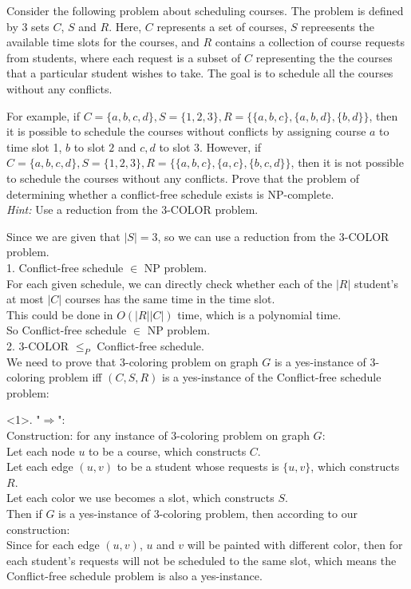 \problem{}
Consider the following problem about scheduling courses.  The problem is defined by 3 sets $C$, $S$ and $R$.  Here, $C$ represents a set of  courses, $S$ repreesents the available time slots for the courses, and $R$ contains a collection of course requests from students, where each request is a subset of $C$ representing the the courses that a particular student wishes to take.  The goal is to schedule all the courses without any conflicts.  

For example, if $C = \{a, b, c, d\}, S = \{1, 2, 3\}, R = \{\{a, b, c\}, \{a, b, d\}, \{b, d\}\}$, then it is possible to schedule the courses without conflicts by assigning course $a$ to time slot 1, $b$ to slot $2$ and $c, d$ to slot 3.  However, if $C = \{a, b, c, d\}, S = \{1, 2, 3\}, R = \{\{a, b, c\}, \{a, c\}, \{b, c, d\}\}$, then it is not possible to schedule the courses without any conflicts.  Prove that the problem of determining whether a conflict-free schedule exists is NP-complete. \\

\noindent  \emph{Hint:}  Use a reduction from the 3-COLOR problem.

\solution{}
Since we are given that $|S|=3$, so we can use a reduction from the $3$-COLOR problem.\\

1. Conflict-free schedule $\in$ NP problem.\\
For each given schedule, we can directly check whether each of the $|R|$ student's at most $|C|$ courses has the same time in the time slot.\\
This could be done in $O(|R||C|)$ time, which is a polynomial time.\\
So Conflict-free schedule $\in$ NP problem.\\

2. $3$-COLOR $\leq_P$ Conflict-free schedule.\\
We need to prove that $3$-coloring problem on graph $G$ is a yes-instance of $3$-coloring problem iff $(C, S, R)$ is a yes-instance of the Conflict-free schedule problem:

<1>. "$\Rightarrow$":\\
Construction: for any instance of $3$-coloring problem on graph $G$:\\
Let each node $u$ to be a course, which constructs $C$.\\ 
Let each edge $(u, v)$ to be a student whose requests is $\{u, v\}$, which constructs $R$.\\
Let each color we use becomes a slot, which constructs $S$.\\
Then if $G$ is a yes-instance of 3-coloring problem, then according to our construction:\\
Since for each edge $(u, v)$, $u$ and $v$ will be painted with different color, then for each student's requests will not be scheduled to the same slot, which means the Conflict-free schedule problem is also a yes-instance.\\


